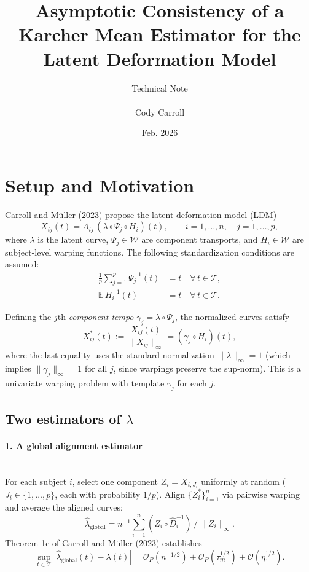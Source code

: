 \documentclass[11pt]{article}
\title{Asymptotic Consistency of a Karcher Mean Estimator for the Latent Deformation Model}
\author{Technical Note\\
	~\\
	Cody Carroll}
\date{Feb. 2026}
\theoremstyle{definition}
\newcommand{\T}{\mathcal{T}}
\newcommand{\W}{\mathcal{W}}
\newcommand{\lhat}{\hat{\lambda}}
\newcommand{\Op}{\mathcal{O}_P}
\newcommand{\sups}{\sup_{t \in \T}}
\begin{document}
\maketitle
\doublespacing

\section*{Setup and Motivation}

Carroll and M\"{u}ller (2023) propose the latent deformation model (LDM)
\begin{equation}
  X_{ij}(t) = A_{ij}\,(\lambda \circ \Psi_j \circ H_i)(t),
  \qquad i = 1,\ldots,n,\quad j = 1,\ldots,p,
  \label{eq:LDM}
\end{equation}
where $\lambda$ is the latent curve, $\Psi_j \in \W$ are component transports,
and $H_i \in \W$ are subject-level warping functions.
The following standardization conditions are assumed:
\begin{align}
  \frac{1}{p}\sum_{j=1}^p \Psi_j^{-1}(t) &= t \quad \forall\, t \in \T,
  \label{eq:std-psi}\\
  \mathbb{E}\, H_i^{-1}(t) &= t \quad \forall\, t \in \T.
  \label{eq:std-H}
\end{align}

\noindent Defining the $j$th \emph{component tempo} $\gamma_j = \lambda \circ \Psi_j$,
the normalized curves satisfy
\[
  X_{ij}^*(t) := \frac{X_{ij}(t)}{\|X_{ij}\|_\infty}
  = (\gamma_j \circ H_i)(t),
\]
where the last equality uses the standard normalization $\|\lambda\|_\infty = 1$
(which implies $\|\gamma_j\|_\infty = 1$ for all $j$, since warpings preserve the
sup-norm). This is a univariate warping problem with template $\gamma_j$ for each $j$.

\subsection*{Two estimators of \texorpdfstring{$\lambda$}{lambda}}

\paragraph{1. A global alignment estimator }
~\\
For each subject $i$, select one component $Z_i = X_{i,J_i}$ uniformly at
random ($J_i \in \{1,\ldots,p\}$, each with probability $1/p$). Align
$\{Z_i^*\}_{i=1}^n$ via pairwise warping and average the aligned curves:
\[
  \lhat_{\mathrm{global}} = n^{-1}\sum_{i=1}^n (Z_i \circ \hat{D}_i^{-1})\,/\,\|Z_i\|_\infty.
\]
Theorem 1c of Carroll and M\"{u}ller (2023) establishes
\[
  \sups |\lhat_{\mathrm{global}}(t) - \lambda(t)|
  = \Op(n^{-1/2}) + \Op(\tau_m^{1/2}) + \mathcal{O}(\eta_1^{1/2}).
\]
\end{document}
